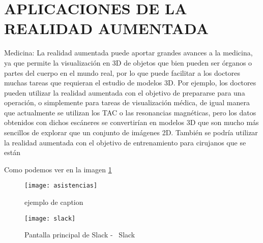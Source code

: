 \section{APLICACIONES DE LA REALIDAD AUMENTADA}
Medicina: La realidad aumentada puede aportar grandes avances a la medicina, ya que permite la visualización en 3D de objetos que bien pueden ser órganos o partes del cuerpo en el mundo real, por lo que puede facilitar a los doctores muchas tareas que requieran el estudio de modelos 3D. Por ejemplo, los doctores pueden utilizar la realidad aumentada con el objetivo de prepararse para una operación, o simplemente para tareas de visualización médica, de igual manera que actualmente se utilizan los TAC o las resonancias magnéticas, pero los datos obtenidos con dichos escáneres se convertirían en modelos 3D que son mucho más sencillos de explorar que un conjunto de imágenes 2D. También se podría utilizar la realidad aumentada con el objetivo de entrenamiento para cirujanos que se están

\newpage
Como podemos ver en la imagen \ref{mireferencia}

\begin{figure}
  \centering
  \texttt{[image: asistencias]}
  \caption{ejemplo de caption}
  \label{mireferencia}
\end{figure}

\begin{figure}
    \centering
    \texttt{[image: slack]}
    \caption{Pantalla principal de Slack - \textcopyright\ Slack}
    \label{slackimage}
\end{figure}

